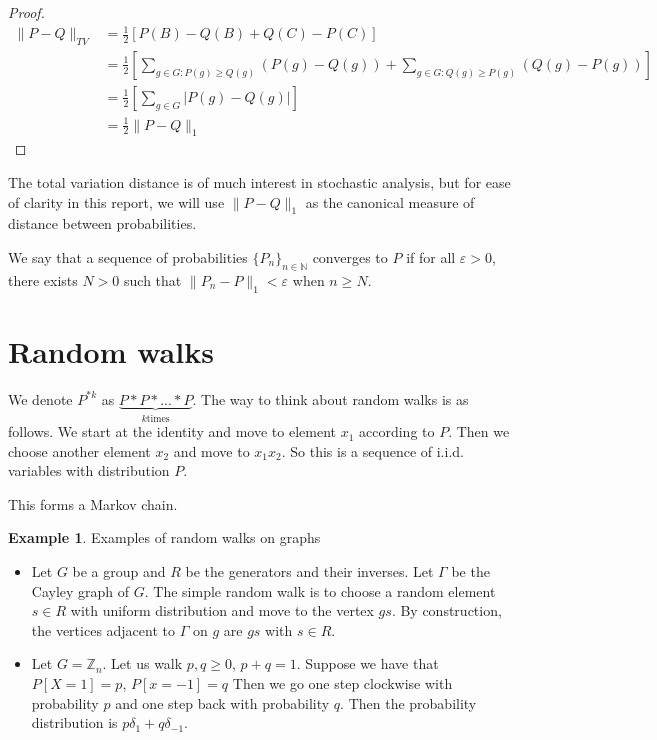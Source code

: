 \documentclass[]{article}
\theoremstyle{definition}
\newtheorem{example}[theorem]{Example}
\numberwithin{theorem}{section}
\numberwithin{equation}{section}
\begin{document}
\begin{proof}
	\begin{align*}
		\|P - Q\|_{TV} &= \frac{1}{2}[P(B) - Q(B) + Q(C) - P(C)]\\
		&=\frac{1}{2}\left[ \sum_{g \in G : P(g) \geq Q(g)} (P(g) - Q(g)) + \sum_{g \in G : Q(g) \geq P(g)} (Q(g) - P(g)) \right]\\
		&= \frac{1}{2}\left[ \sum_{g \in G}|P(g) - Q(g)| \right]\\
		&= \frac{1}{2}\|P - Q\|_1
	\end{align*}
\end{proof}

The total variation distance is of much interest in stochastic analysis, but for ease of clarity in this report, we will use $\|P - Q\|_1$ as the canonical measure of distance between probabilities. 

We say that a sequence of probabilities $\lbrace P_n \rbrace_{n \in \mathbb{N}}$ converges to $P$ if for all $\varepsilon > 0$, there exists $N > 0$ such that $\|P_n - P \|_1 < \varepsilon$ when $n \geq N$. 
\section{Random walks}
We denote $P^{\ast k}$ as $\underbrace{P \ast P \ast ... \ast P}_{k \text{times}}$. 
The way to think about random walks is as follows. We start at the identity and move to element $x_1$ according to $P$. Then we choose another element $x_2$ and move to $x_1 x_2$. So this is a sequence of i.i.d. variables with distribution $P$.

This forms a Markov chain. 

\begin{example}
	Examples of random walks on graphs
	\begin{itemize}
		\item Let $G$ be a group and $R$ be the generators and their inverses. Let $\Gamma$ be the Cayley graph of $G$. The simple random walk is to choose a random element $s \in R$ with uniform distribution and move to the vertex $gs$. By construction, the vertices adjacent to $\Gamma$ on $g$ are $gs$ with $s \in R$.
		\item Let $G = \mathbb{Z}_n$. Let us walk  $p, q \geq 0$, $p + q = 1$. Suppose we have that $P[X = 1] = p$, $P[x = -1] = q$ Then we go one step clockwise with probability $p$ and one step back with probability $q$. Then the probability distribution is $p \delta_1 + q \delta_{-1}$. 
	\end{itemize}
\end{example}
\end{document}
